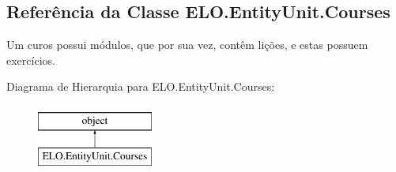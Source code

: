 \hypertarget{classELO_1_1EntityUnit_1_1Courses}{}\subsection{Referência da Classe E\+L\+O.\+Entity\+Unit.\+Courses}
\label{classELO_1_1EntityUnit_1_1Courses}


Um curos possui módulos, que por sua vez, contêm lições, e estas possuem exercícios.  


Diagrama de Hierarquia para E\+L\+O.\+Entity\+Unit.\+Courses\+:\begin{figure}[H]
\begin{center}
\leavevmode
\includegraphics[height=2.000000cm]{d2/dc4/classELO_1_1EntityUnit_1_1Courses}
\end{center}
\end{figure}
